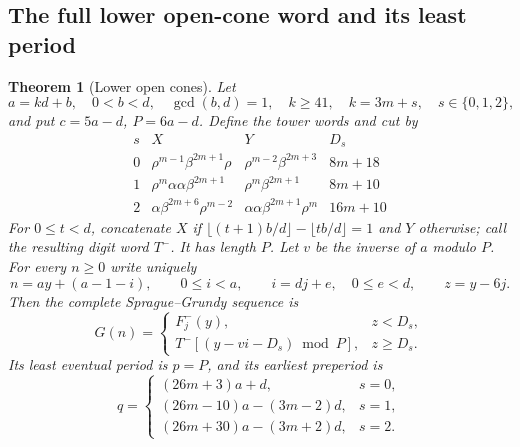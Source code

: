 \documentclass[11pt]{article}
\newtheorem{theorem}{Theorem}[section]
\theoremstyle{remark}\newtheorem{remark}[theorem]{Remark}
\begin{document}
\subsection{The full lower open-cone word and its least period}
\begin{theorem}[Lower open cones]\label{thm:lower-open}
Let
\[
 a=kd+b,\quad 0<b<d,\quad \gcd(b,d)=1,\quad
 k\ge41,\quad k=3m+s,\quad s\in\{0,1,2\},
\]
and put $c=5a-d$, $P=6a-d$. Define the tower words and cut by
\begin{equation}\label{eq:lower-towers}
\begin{array}{c|c|c|c}
 s&X&Y&D_s\\\hline
 0&\rho^{m-1}\beta^{2m+1}\rho&\rho^{m-2}\beta^{2m+3}&8m+18\\
 1&\rho^m\alpha\alpha\beta^{2m+1}&\rho^m\beta^{2m+1}&8m+10\\
 2&\alpha\beta^{2m+6}\rho^{m-2}&\alpha\alpha\beta^{2m+1}\rho^m&16m+10
\end{array}
\end{equation}
For $0\le t<d$, concatenate $X$ if
$\lfloor(t+1)b/d\rfloor-\lfloor tb/d\rfloor=1$ and $Y$ otherwise;
call the resulting digit word $T^-$. It has length $P$.
Let $v$ be the inverse of $a$ modulo $P$. For every $n\ge0$ write uniquely
\begin{equation}\label{eq:lower-coordinates}
 n=ay+(a-1-i),\qquad 0\le i<a,\qquad i=dj+e,\quad 0\le e<d,
 \qquad z=y-6j.
\end{equation}
Then the complete Sprague--Grundy sequence is
\begin{equation}\label{eq:lower-open-word}
 G(n)=
 \begin{cases}
 F^-_j(y),&z<D_s,\\
 T^-[(y-vi-D_s)\bmod P],&z\ge D_s.
 \end{cases}
\end{equation}
Its least eventual period is $p=P$, and its earliest preperiod is
\begin{equation}\label{eq:lower-open-q}
 q=
 \begin{cases}
 (26m+3)a+d,&s=0,\\
 (26m-10)a-(3m-2)d,&s=1,\\
 (26m+30)a-(3m+2)d,&s=2.
 \end{cases}
\end{equation}
\end{theorem}
\end{document}
